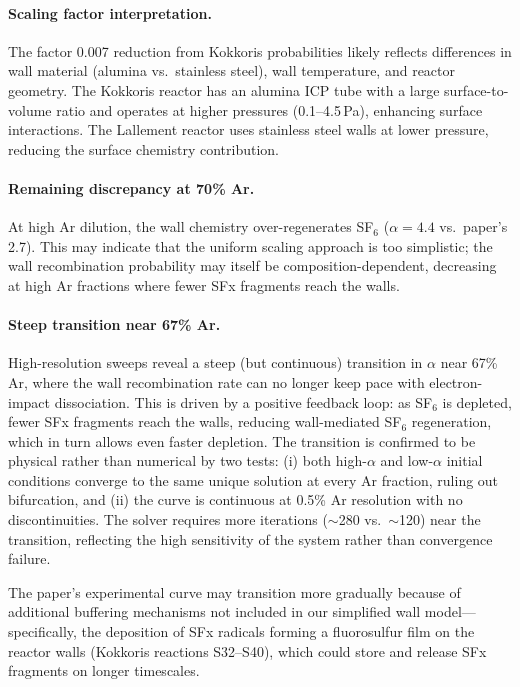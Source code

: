 \documentclass[11pt,a4paper]{article}
\begin{document}
\paragraph{Scaling factor interpretation.}  The factor 0.007 reduction from Kokkoris probabilities likely reflects differences in wall material (alumina vs.\ stainless steel), wall temperature, and reactor geometry.  The Kokkoris reactor has an alumina ICP tube with a large surface-to-volume ratio and operates at higher pressures (0.1--4.5\,Pa), enhancing surface interactions.  The Lallement reactor uses stainless steel walls at lower pressure, reducing the surface chemistry contribution.

\paragraph{Remaining discrepancy at 70\% Ar.}  At high Ar dilution, the wall chemistry over-regenerates SF$_6$ ($\alpha = 4.4$ vs.\ paper's 2.7).  This may indicate that the uniform scaling approach is too simplistic; the wall recombination probability may itself be composition-dependent, decreasing at high Ar fractions where fewer SFx fragments reach the walls.

\paragraph{Steep transition near 67\% Ar.}  High-resolution sweeps reveal a steep (but continuous) transition in $\alpha$ near 67\% Ar, where the wall recombination rate can no longer keep pace with electron-impact dissociation.  This is driven by a positive feedback loop: as SF$_6$ is depleted, fewer SFx fragments reach the walls, reducing wall-mediated SF$_6$ regeneration, which in turn allows even faster depletion.  The transition is confirmed to be physical rather than numerical by two tests: (i) both high-$\alpha$ and low-$\alpha$ initial conditions converge to the same unique solution at every Ar fraction, ruling out bifurcation, and (ii) the curve is continuous at 0.5\% Ar resolution with no discontinuities.  The solver requires more iterations ($\sim$280 vs.\ $\sim$120) near the transition, reflecting the high sensitivity of the system rather than convergence failure.

The paper's experimental curve may transition more gradually because of additional buffering mechanisms not included in our simplified wall model---specifically, the deposition of SFx radicals forming a fluorosulfur film on the reactor walls (Kokkoris reactions S32--S40), which could store and release SFx fragments on longer timescales.
\end{document}
